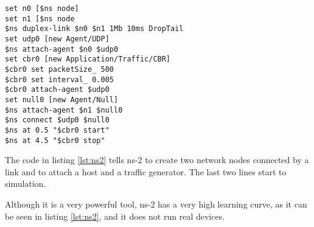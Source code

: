 \lstset{language=zsh, caption=NS-2 topology, label=lst:ns2}
\begin{lstlisting}
set n0 [$ns node]
set n1 [$ns node
$ns duplex-link $n0 $n1 1Mb 10ms DropTail
set udp0 [new Agent/UDP]
$ns attach-agent $n0 $udp0
set cbr0 [new Application/Traffic/CBR]
$cbr0 set packetSize_ 500
$cbr0 set interval_ 0.005
$cbr0 attach-agent $udp0
set null0 [new Agent/Null] 
$ns attach-agent $n1 $null0
$ns connect $udp0 $null0
$ns at 0.5 "$cbr0 start"
$ns at 4.5 "$cbr0 stop"
\end{lstlisting}

The code in listing \ref{lst:ns2} tells ns-2 to create two network nodes connected by a link
and to attach a host and a traffic generator. The last two lines start to simulation.

Although it is a very powerful tool, ns-2 has a very high learning curve, as it can be seen
in listing \ref{lst:ns2}, and it does not run real devices.
